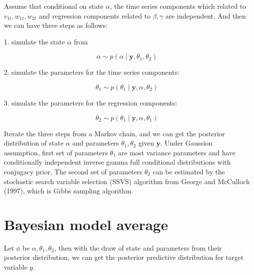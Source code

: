 Assume that conditional on state $\alpha$, the time series components which related to $v_{1t},w_{1t},w_{2t}$ and regression components related to $\beta, \gamma$ are independent. And then we can have three steps as follows:







1. simulate the state $\alpha$ from 



$$\alpha \sim p(\alpha \mid \mathbf{y}, \theta_1, \theta_2)$$



2. simulate the parameters for the time series components:



$$\theta_1 \sim  p(\theta_1  \mid \mathbf{y},\alpha,  \theta_2)$$



3. simulate the parameters for the regression components:



$$\theta_2 \sim  p(\theta_1  \mid \mathbf{y},\alpha,  \theta_1)$$







Iterate the three steps from a Markov chain, and we can get the posterior distribution of state $\alpha$ and parameters $\theta_1, \theta_2$ given $\mathbf{y}$. Under Gaussion assumption, first set of parameters $\theta_1$ are most variance parameters and have  conditionally independent inverse gamma full conditional distributions with conjugacy prior. The second set of parameters $\theta_2$ can be estimated by the stochastic search variable selection (SSVS) algorithm from George and McCulloch (1997), which is Gibbs sampling algorithm. 






\section{Bayesian model average}







Let $\phi$ be $\alpha, \theta_1, \theta_2$, then with the draw of state and parameters from their posterior distribution, we can get the posterior predictive distribution for target variable $y$.  



